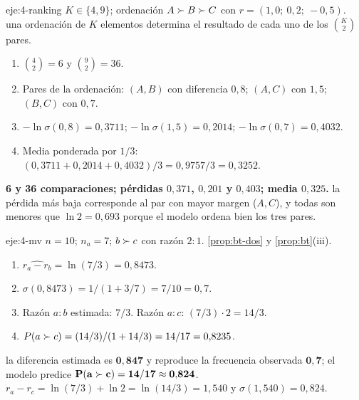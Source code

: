 \begin{solucion}{eje:4-ranking}
\datos $K\in\{4,9\}$; ordenación $A\succ B\succ C$ con $r=(1{,}0;\ 0{,}2;\ -0{,}5)$.
\planteamiento una ordenación de $K$ elementos determina el resultado de cada uno de los $\binom K2$ pares.
\pasos
\begin{enumerate}[label=\arabic*.]
  \item $\binom 42=6$ y $\binom 92=36$.
  \item Pares de la ordenación: $(A,B)$ con diferencia $0{,}8$; $(A,C)$ con $1{,}5$; $(B,C)$ con $0{,}7$.
  \item $-\ln\sigma(0{,}8)=0{,}3711$; $-\ln\sigma(1{,}5)=0{,}2014$; $-\ln\sigma(0{,}7)=0{,}4032$.
  \item Media ponderada por $1/3$: $(0{,}3711+0{,}2014+0{,}4032)/3=0{,}9757/3=0{,}3252$.
\end{enumerate}
\resultado \textbf{6 y 36 comparaciones; pérdidas $0{,}371$, $0{,}201$ y $0{,}403$; media $0{,}325$.}
\comprobacion la pérdida más baja corresponde al par con mayor margen ($A,C$), y todas son menores que $\ln 2=0{,}693$ porque el modelo ordena bien los tres pares.
\end{solucion}

\begin{solucion}{eje:4-mv}
\datos $n=10$; $n_a=7$; $b\succ c$ con razón $2{:}1$.
\planteamiento \cref{prop:bt-dos} y \cref{prop:bt}(iii).
\pasos
\begin{enumerate}[label=\arabic*.]
  \item $\widehat{r_a-r_b}=\ln(7/3)=0{,}8473$.
  \item $\sigma(0{,}8473)=1/(1+3/7)=7/10=0{,}7$.
  \item Razón $a{:}b$ estimada: $7/3$. Razón $a{:}c$: $(7/3)\cdot 2=14/3$.
  \item $P(a\succ c)=(14/3)/(1+14/3)=14/17=0{,}8235$.
\end{enumerate}
\resultado la diferencia estimada es $\mathbf{0{,}847}$ y reproduce la frecuencia observada $\mathbf{0{,}7}$; el modelo predice $\mathbf{P(a\succ c)=14/17\approx 0{,}824}$.
\comprobacion $r_a-r_c=\ln(7/3)+\ln 2=\ln(14/3)=1{,}540$ y $\sigma(1{,}540)=0{,}824$.
\end{solucion}

